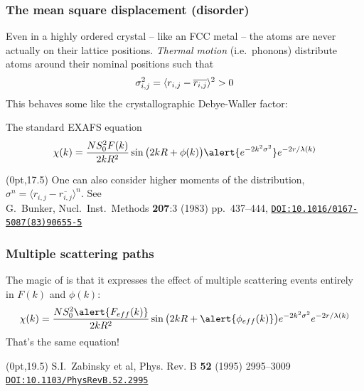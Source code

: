\documentclass[10pt, xcolor=x11names, compress]{beamer}
\begin{document}
\begin{frame}
  \frametitle{The mean square displacement (disorder)}
  Even in a highly ordered crystal -- like an FCC metal -- the atoms
  are never actually on their lattice positions.  \textit{Thermal
    motion} (i.e.\ phonons) distribute atoms around their nominal
  positions such that
  \begin{equation}
    \sigma_{i,j}^2 = \langle r_{i,j}-\overline{r_{i,j}} \rangle^2 > 0
    \notag
  \end{equation}
  This behaves some like the crystallographic Debye-Waller factor:
  \begin{exampleblock}{The standard EXAFS equation}
    \begin{equation}
      \chi(k) = \frac{NS_0^2F(k)}{2kR^2}\sin\big(2kR+\phi(k)\big)
      \alert{e^{-2k^2\sigma^2}}e^{-2r/\lambda(k)}
      \notag
    \end{equation}
  \end{exampleblock}

  \begin{textblock*}{0.8\linewidth}(0pt,17.5\TPVertModule)%
    {\scriptsize
      One can also consider higher moments of the distribution,
      $\sigma^n = \langle r_{i,j}-\overline{r_{i,j}} \rangle^n$.  See
    }\\
    {\tiny%
      G.\ Bunker, Nucl.\ Inst.\ Methods \textbf{207}:3 (1983) pp.\
      437--444,
      \href{http://dx.doi.org/10.1016/0167-5087(83)90655-5}
      {\color{Blue4}\texttt{DOI:10.1016/0167-5087(83)90655-5}}
    }
  \end{textblock*}
\end{frame}

\begin{frame}
  \frametitle{Multiple scattering paths}
  The magic of {\feff} is that it expresses the effect of multiple
  scattering events entirely in $F(k)$ and $\phi(k)$:
  \begin{equation}
    \chi(k) = \frac{NS_0^2\alert{F_{eff}(k)}}{2kR^2}
    \sin\big(2kR+\alert{\phi_{eff}(k)}\big)
    e^{-2k^2\sigma^2}e^{-2r/\lambda(k)}
    \notag
  \end{equation}
  That's the same equation!

  \begin{textblock*}{0.6\linewidth}(0pt,19.5\TPVertModule)%
    \tiny%
    S.I.\ Zabinsky et al, Phys. Rev. B \textbf{52} (1995) 2995--3009\\
    \href{http://dx.doi.org/10.1103/PhysRevB.52.2995}
    {\color{Blue4}\texttt{DOI:10.1103/PhysRevB.52.2995}}    
  \end{textblock*}
\end{frame}
\end{document}
